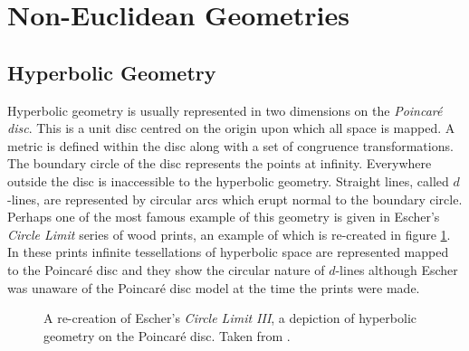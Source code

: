 \section{Non-Euclidean Geometries}

\subsection{Hyperbolic Geometry}

Hyperbolic geometry is usually represented in two dimensions on the
\emph{Poincar\'e disc}. This is a unit disc centred on the origin
upon which all space is mapped. A metric is defined within the
disc\cite{GEOM:Brannan} along with a set of congruence transformations.
The boundary circle of the disc represents the points at infinity. Everywhere
outside the disc is inaccessible to the hyperbolic geometry. Straight lines,
called $d$-lines\cite{GEOM:brannan}, are represented by circular arcs which
erupt normal to the boundary circle. Perhaps one of the most famous example of this
geometry is given in Escher's \emph{Circle Limit} series of wood prints, an example of
which is re-created in figure \ref{fig:circlelimit}. In these prints infinite
tessellations of hyperbolic space are represented mapped to the Poincar\'e
disc and they show the circular nature of $d$-lines although Escher was
unaware of the Poincar\'e disc model at the time the prints were made.

\begin{figure} \centering
{}
\caption{A re-creation of Escher's \emph{Circle Limit III}, 
a depiction of hyperbolic geometry on the Poincar\'e disc.
Taken from \cite{transhyp}.}
\label{fig:circlelimit}
\end{figure}


